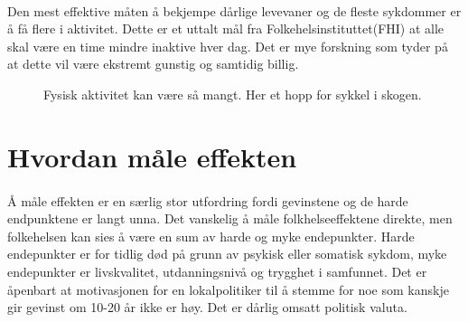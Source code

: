 \documentclass[11pt]{memoir} %
\begin{document}
		\paragraph{}
			Den mest effektive måten å bekjempe dårlige levevaner og de fleste sykdommer er å få flere i aktivitet\cite{aktivhb}. Dette er et uttalt mål fra Folkehelsinstituttet(FHI)\cite{htnorge} at alle skal være en time mindre inaktive hver dag. Det er mye forskning som tyder på at dette vil være ekstremt gunstig og samtidig billig.
					\begin{figure}[h]
                      \centering
                    	  \captionsetup{singlelinecheck=off}
                      	\caption{Fysisk aktivitet kan være så mangt. Her et hopp for sykkel i skogen.}
                      	\label{bikeukfig}
                    \end{figure}  

	\section{Hvordan måle effekten}
		\paragraph{}
			Å måle effekten er en særlig stor utfordring fordi gevinstene og de harde endpunktene er langt unna. Det vanskelig å måle folkhelseeffektene direkte, men folkehelsen kan sies å være en sum av harde og myke endepunkter. Harde endepunkter er for tidlig død på grunn av psykisk eller somatisk sykdom, myke endepunkter er livskvalitet, utdanningsnivå og trygghet i samfunnet. Det er åpenbart at motivasjonen for en lokalpolitiker til å stemme for noe som kanskje gir gevinst om 10-20 år ikke er høy. Det er dårlig omsatt politisk valuta. 
\end{document}
